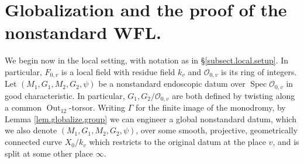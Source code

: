 \documentclass[openany]{amsbook}
\theoremstyle{definition}
\theoremstyle{remark}
\numberwithin{equation}{section}
\renewcommand{\O}{\mathcal{O}}
\renewcommand{\-}{\operatorname{-}}
\newcommand{\Spec}{\operatorname{Spec}}
\newcommand{\Out}{\operatorname{Out}}
\begin{document}
\section{Globalization and the proof of the nonstandard WFL.}\label{subsect.nonstd.globalization}

We begin now in the local setting, with notation as in \S \ref{subsect.local.setup}. In particular, $F_{0,v}$ is a local field with residue field $k_v$ and $\O_{0,v}$ is its ring of integers. Let $(M_{1}, G_{1}, M_2, G_2, \psi)$ be a nonstandard endoscopic datum over $\Spec \O_{0,v}$ in good characteristic. In particular, $G_1, G_2/\O_{0,v}$ are both defined by twisting along a common $\Out_{12}$-torsor. Writing $\Gamma$ for the finite image of the monodromy, by Lemma \ref{lem.globalize.group} we can engineer a global nonstandard datum, which we also denote $(M_{1}, G_{1}, M_2, G_2, \psi)$, over some smooth, projective, geometrically connected curve $X_0/k_v$ which restricts to the original datum at the place $v$, and is split at some other place $\infty$. 
\end{document}
